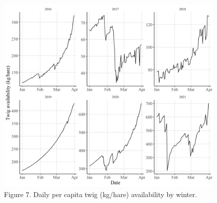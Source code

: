 \documentclass[
]{article}
\begin{document}
\begin{figure}
\centering
\includegraphics{Output/Figures/percap_daily_figure.jpeg}
\caption{Figure 7. Daily per capita twig (kg/hare) availability by
winter.}
\end{figure}
\end{document}
